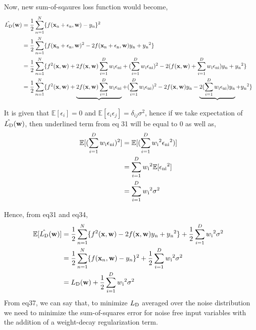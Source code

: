 \documentclass{exam}
\newcommand{\xx}{{\bf{x}}}
\newcommand{\ww}{{\bf{w}}}
\begin{document}
\begin{questions}
Now, new sum-of-sqaures loss function would become,
\begin{align}
\hat{L\textsubscript{D}}(\ww) &= \frac{1}{2} \sum_{n=1}^N \{f(\xx\textsubscript{n}+\epsilon\textsubscript{n}, \ww)-y\textsubscript{n}\}^2 \\
&= \frac{1}{2} \sum_{n=1}^N \{f(\xx\textsubscript{n}+\epsilon\textsubscript{n}, \ww)^2 -2f(\xx\textsubscript{n}+\epsilon\textsubscript{n}, \ww)y\textsubscript{n}+y\textsubscript{n}^2\} \\
&= \frac{1}{2} \sum_{n=1}^N \{f^2(\xx,\ww)+2f(\xx,\ww) \sum_{i=1}^D w\textsubscript{i}\epsilon\textsubscript{ni} 
+( \sum_{i=1}^D w\textsubscript{i}\epsilon\textsubscript{ni})^2 -2(f(\xx, \ww) + \sum_{i=1}^D w\textsubscript{i}\epsilon\textsubscript{ni})y\textsubscript{n} + y\textsubscript{n}^2\} \\
&= \frac{1}{2} \sum_{n=1}^N \{f^2(\xx,\ww)+\underbrace{2f(\xx,\ww) \sum_{i=1}^D w\textsubscript{i}\epsilon\textsubscript{ni}} 
+( \sum_{i=1}^D w\textsubscript{i}\epsilon\textsubscript{ni})^2 -2f(\xx, \ww)y\textsubscript{n} -\underbrace{2 (\sum_{i=1}^D w\textsubscript{i}\epsilon\textsubscript{ni})y\textsubscript{n}} + y\textsubscript{n}^2\}
\end{align}

It is given that $\mathbb{E}[\epsilon_i]=0$ and $\mathbb{E}[\epsilon_i\epsilon_j]=\delta_{ij} \sigma^2$, hence if we take expectation of $\hat{L\textsubscript{D}}(\ww)$, then underlined term from eq 31 will be equal to 0 as well as, \\
\begin{align}
\mathbb{E}[( \sum_{i=1}^D w\textsubscript{i}\epsilon\textsubscript{ni})^2] 
&= \mathbb{E}[( \sum_{i=1}^D w\textsubscript{i}^2\epsilon\textsubscript{ni}^2)] \\
&= \sum_{i=1}^D w\textsubscript{i}^2\mathbb{E}[\epsilon\textsubscript{ni}^2] \\
&=  \sum_{i=1}^D w\textsubscript{i}^2\sigma^2 
\end{align}

Hence, from eq31 and eq34, 
\begin{align}
\mathbb{E}[\hat{L\textsubscript{D}}(\ww)]
&= \frac{1}{2} \sum_{n=1}^N \{f^2(\xx,\ww) -2f(\xx, \ww)y\textsubscript{n} + y\textsubscript{n}^2\}+ \frac{1}{2} \sum_{i=1}^D w\textsubscript{i}^2\sigma^2 \\
&= \frac{1}{2} \sum_{n=1}^N \{f(\xx_n,\ww) - y_n\}^2+\frac{1}{2} \sum_{i=1}^D w\textsubscript{i}^2\sigma^2 \\
&= L\textsubscript{D}(\ww) +\frac{1}{2} \sum_{i=1}^D w\textsubscript{i}^2\sigma^2
\end{align}
From eq37, we can say that, to minimize $L\textsubscript{D}$ averaged over the noise distribution we need to minimize the sum-of-squares error for noise free input variables with the addition of a weight-decay regularization term.


\end{questions}
\end{document}
